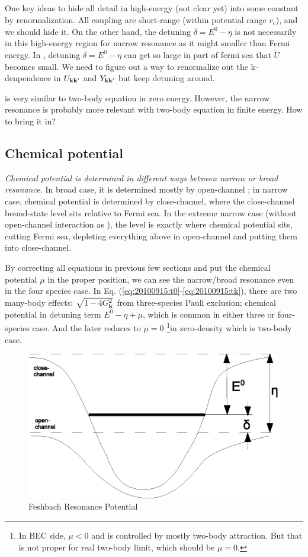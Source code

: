 \subsection{}
One key ideas to hide all detail in high-energy (not clear yet) into some constant by renormalization.  All coupling are short-range (within potential range $r_{c}$), and we should hide it.  On the other hand, the detuning $\delta=E^{0}-\eta$ is not necessarily in this high-energy region for narrow resonance as it might smaller than Fermi energy.  In , detuning $\delta=E^{0}-\eta$ can get so large in part of fermi sea that $\tilde{U}$ becomes small.  We need to figure out a way to renormalize out the k-denpendence in $U_{\mathbf{k}\mathbf{k}'}$ and $Y_{\mathbf{k}\mathbf{k}'}$ but keep detuning around.  

 is very similar to two-body \sch equation in zero energy.  However, the narrow resonance is probably more relevant with two-body \sch equation in finite energy.  How to bring it in?

\subsection{Chemical potential}
\emph{Chemical potential is determined in different ways between narrow or broad resonance.  }In broad case, it is determined mostly by open-channel ; in narrow case, chemical potential is determined by close-channel, where the close-channel bound-state level sits relative to Fermi sea.  In the extreme narrow case (without open-channel interaction as \cite{GurarieNarrow}), the level is exactly where chemical potential sits, cutting Fermi sea, depleting everything above in open-channel and putting them into close-channel.   

By correcting all equations in previous few sections and put the chemical potential $\mu$ in the proper position, we can see the narrow/broad resonance even in the four species case.  In Eq. (\ref{eq:20100915:t0}-\ref{eq:20100915:tk}), there are two many-body effects: $\sqrt{1-4G_{\mathbf{k}}^{2}}$ from three-species Pauli exclusion; chemical potential in detuning term $E^{0}-\eta+\mu$, which is common in either three or four-species case.  And the later reduces to $\mu=0$ \footnote{In BEC side, $\mu<0$ and is controlled by mostly two-body attraction.  But that is not proper for real two-body limit, which should be $\mu=0$.}in zero-density which is two-body case. 
\begin{figure}[hhtb]
	\centering
		\includegraphics[width=.50\textwidth]{image/FeshbachPotential}
	\caption{Feshbach Resonance Potential\label{fig:FeshbachPotential}}	
\end{figure}

